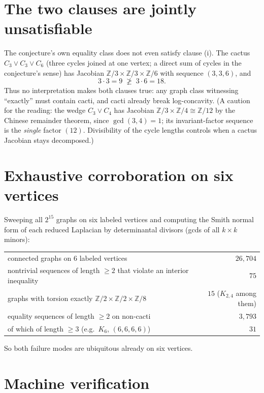 \documentclass[11pt]{article}
\theoremstyle{definition}
\begin{document}
\section{The two clauses are jointly unsatisfiable}

The conjecture's own equality class does not even satisfy clause (i).  The cactus
$C_3 \vee C_3 \vee C_6$ (three cycles joined at one vertex; a direct sum of cycles
in the conjecture's sense) has Jacobian
$\mathbb{Z}/3 \times \mathbb{Z}/3 \times \mathbb{Z}/6$ with sequence $(3,3,6)$, and
\[
3 \cdot 3 = 9 \;\not\ge\; 3 \cdot 6 = 18 .
\]
Thus no interpretation makes both clauses true: any graph class witnessing
``exactly'' must contain cacti, and cacti already break log-concavity.  (A caution
for the reading: the wedge $C_3 \vee C_4$ has Jacobian $\mathbb{Z}/3 \times
\mathbb{Z}/4 \cong \mathbb{Z}/12$ by the Chinese remainder theorem, since
$\gcd(3,4) = 1$; its invariant-factor sequence is the \emph{single} factor $(12)$.
Divisibility of the cycle lengths controls when a cactus Jacobian stays decomposed.)

\section{Exhaustive corroboration on six vertices}

Sweeping all $2^{15}$ graphs on six labeled vertices and computing the Smith normal
form of each reduced Laplacian by determinantal divisors (gcds of all $k \times k$
minors):
\begin{center}
\begin{tabular}{lr}
\hline
connected graphs on $6$ labeled vertices & $26{,}704$\\
nontrivial sequences of length $\ge 2$ that violate an interior inequality & $75$\\
graphs with torsion exactly $\mathbb{Z}/2 \times \mathbb{Z}/2 \times \mathbb{Z}/8$ & $15$
  \quad ($K_{2,4}$ among them)\\
equality sequences of length $\ge 2$ on non-cacti & $3{,}793$\\
\quad of which of length $\ge 3$ (e.g.\ $K_6$, $(6,6,6,6)$) & $31$\\
\hline
\end{tabular}
\end{center}
So both failure modes are ubiquitous already on six vertices.

\section{Machine verification}
\end{document}
